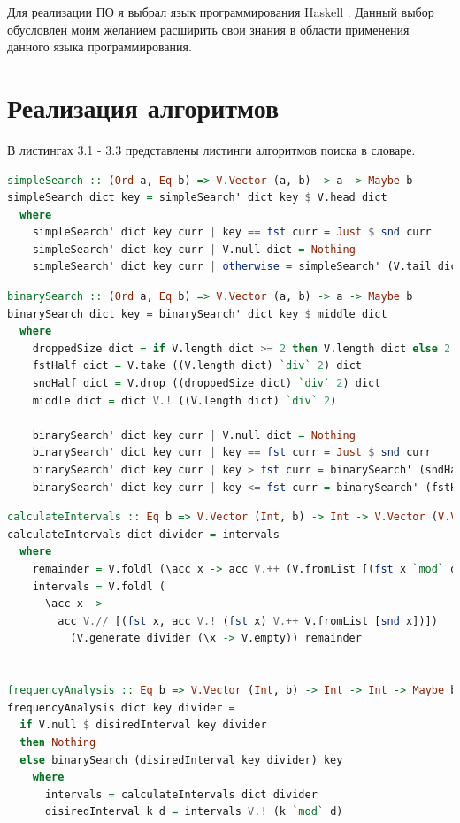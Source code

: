 \documentclass[12pt]{report}
\begin{document}
	Для реализации ПО я выбрал язык программирования Haskell \cite{Haskell}. Данный выбор обусловлен моим желанием расширить свои знания в области применения данного языка программирования.
	
\section{Реализация алгоритмов}

В листингах 3.1 - 3.3 представлены листинги алгоритмов поиска в словаре.
	
\begin{lstlisting}[label=some-code,caption=Алгоритм полного перебора, language=Haskell]
simpleSearch :: (Ord a, Eq b) => V.Vector (a, b) -> a -> Maybe b
simpleSearch dict key = simpleSearch' dict key $ V.head dict 
  where
    simpleSearch' dict key curr | key == fst curr = Just $ snd curr
    simpleSearch' dict key curr | V.null dict = Nothing
    simpleSearch' dict key curr | otherwise = simpleSearch' (V.tail dict) key $ V.head dict
\end{lstlisting}
	
\begin{lstlisting}[label=some-code,caption=Алгоритм двоичного поиска, language=Haskell]
binarySearch :: (Ord a, Eq b) => V.Vector (a, b) -> a -> Maybe b 
binarySearch dict key = binarySearch' dict key $ middle dict
  where
    droppedSize dict = if V.length dict >= 2 then V.length dict else 2
    fstHalf dict = V.take ((V.length dict) `div` 2) dict
    sndHalf dict = V.drop ((droppedSize dict) `div` 2) dict
    middle dict = dict V.! ((V.length dict) `div` 2)

	binarySearch' dict key curr | V.null dict = Nothing
	binarySearch' dict key curr | key == fst curr = Just $ snd curr
	binarySearch' dict key curr | key > fst curr = binarySearch' (sndHalf dict) key (middle $ sndHalf dict)
	binarySearch' dict key curr | key <= fst curr = binarySearch' (fstHalf dict) key $ (middle $ fstHalf dict)
\end{lstlisting}

\begin{lstlisting}[label=some-code,caption=Алгоритм частотного анализа, language=Haskell]
calculateIntervals :: Eq b => V.Vector (Int, b) -> Int -> V.Vector (V.Vector (Int, b))
calculateIntervals dict divider = intervals
  where 
    remainder = V.foldl (\acc x -> acc V.++ (V.fromList [(fst x `mod` divider, x)])) (V.empty) dict
    intervals = V.foldl (
      \acc x ->
        acc V.// [(fst x, acc V.! (fst x) V.++ V.fromList [snd x])])
          (V.generate divider (\x -> V.empty)) remainder


frequencyAnalysis :: Eq b => V.Vector (Int, b) -> Int -> Int -> Maybe b
frequencyAnalysis dict key divider = 
  if V.null $ disiredInterval key divider
  then Nothing 
  else binarySearch (disiredInterval key divider) key
    where
      intervals = calculateIntervals dict divider
      disiredInterval k d = intervals V.! (k `mod` d)
\end{lstlisting}
	
\end{document}
